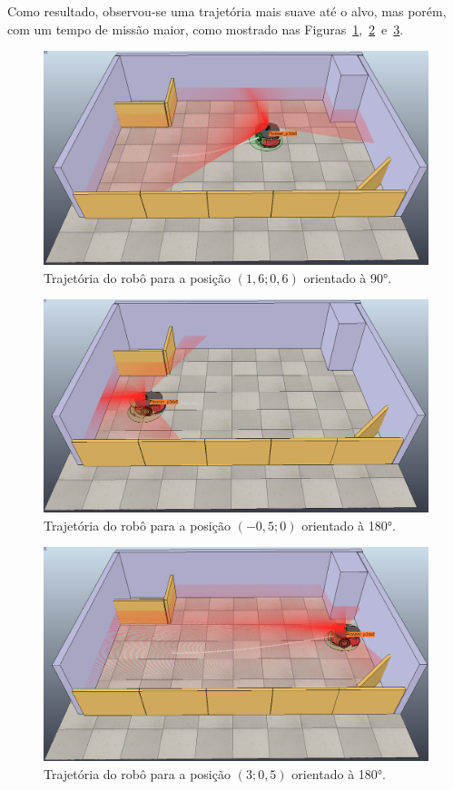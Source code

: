 Como resultado, observou-se uma trajetória mais suave até o alvo, mas porém, com um tempo de missão maior, como mostrado nas Figuras~\ref{fig:5-1},~\ref{fig:5-2}~e~\ref{fig:5-3}.

\begin{figure}[H]
	\centering
	\includegraphics[width=0.6\linewidth]{img/5-1}
	\caption{Trajetória do robô para a posição $(1,6; 0,6)$ orientado à 90°.}
	\label{fig:5-1}
\end{figure}



\begin{figure}[H]
	\centering
	\includegraphics[width=0.6\linewidth]{img/5-2}
	\caption{Trajetória do robô para a posição $(-0,5; 0)$ orientado à 180°.}
	\label{fig:5-2}
\end{figure}


\begin{figure}[H]
	\centering
	\includegraphics[width=0.6\linewidth]{img/5-3}
	\caption{Trajetória do robô para a posição $(3; 0,5)$ orientado à 180°.}
	\label{fig:5-3}
\end{figure}